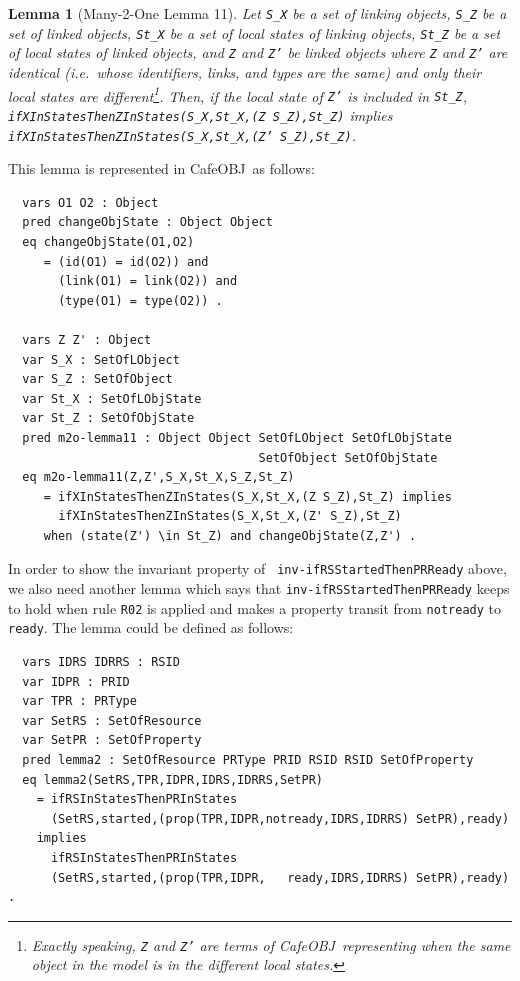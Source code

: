 \documentclass[12pt]{report}
\newtheorem{lemma}{Lemma}
\newcommand{\stt}[1]{{\small{\tt {#1}}}}
\newcommand{\cafeobj}{{\sf CafeOBJ}~}
\begin{document}
\begin{lemma}[Many-2-One Lemma 11]
  Let {\tt S\_X} be a set of linking objects, {\tt S\_Z} be a set of
  linked objects, {\tt St\_X} be a set of local states of linking
  objects, {\tt St\_Z} be a set of local states of linked objects, and
  {\tt Z} and {\tt Z'} be linked objects where {\tt Z} and {\tt Z'}
  are identical (i.e.\ whose identifiers, links, and types are the
  same) and only their local states are different\footnote{Exactly
    speaking, {\tt Z} and {\tt Z'} are terms of \cafeobj representing
    when the same object in the model is in the different local
    states.}.  Then, if the local state of {\tt Z'} is included in
  {\tt St\_Z}, \stt{ifXInStatesThenZInStates(S\_X,St\_X,(Z S\_Z),St\_Z)}
  implies\\ \stt{ifXInStatesThenZInStates(S\_X,St\_X,(Z' S\_Z),St\_Z)}.
\end{lemma}
This lemma is represented in \cafeobj as follows:
\small
\begin{verbatim}
  vars O1 O2 : Object
  pred changeObjState : Object Object
  eq changeObjState(O1,O2)
     = (id(O1) = id(O2)) and 
       (link(O1) = link(O2)) and
       (type(O1) = type(O2)) .

  vars Z Z' : Object
  var S_X : SetOfLObject
  var S_Z : SetOfObject
  var St_X : SetOfLObjState
  var St_Z : SetOfObjState
  pred m2o-lemma11 : Object Object SetOfLObject SetOfLObjState
                                   SetOfObject SetOfObjState
  eq m2o-lemma11(Z,Z',S_X,St_X,S_Z,St_Z)
     = ifXInStatesThenZInStates(S_X,St_X,(Z S_Z),St_Z) implies
       ifXInStatesThenZInStates(S_X,St_X,(Z' S_Z),St_Z) 
     when (state(Z') \in St_Z) and changeObjState(Z,Z') .
\end{verbatim}
\normalsize
In order to show the invariant property of {\tt
  inv-ifRSStartedThenPRReady} above, we also need another lemma which
says that {\tt inv-ifRSStartedThenPRReady} keeps to hold when rule
{\tt R02} is applied and makes a property transit from {\tt notready}
to {\tt ready}.  The lemma could be defined as follows:
\small
\begin{verbatim}
  vars IDRS IDRRS : RSID 
  var IDPR : PRID
  var TPR : PRType
  var SetRS : SetOfResource
  var SetPR : SetOfProperty
  pred lemma2 : SetOfResource PRType PRID RSID RSID SetOfProperty
  eq lemma2(SetRS,TPR,IDPR,IDRS,IDRRS,SetPR)
    = ifRSInStatesThenPRInStates
      (SetRS,started,(prop(TPR,IDPR,notready,IDRS,IDRRS) SetPR),ready)
    implies
      ifRSInStatesThenPRInStates
      (SetRS,started,(prop(TPR,IDPR,   ready,IDRS,IDRRS) SetPR),ready) .
\end{verbatim}
\end{document}
